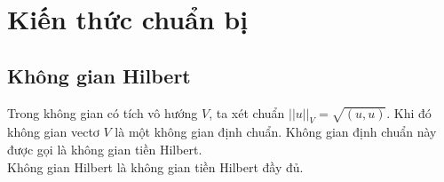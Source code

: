 \documentclass[
12pt, %
oneside, %
english, %
onehalfspacing, %
nolistspacing, %
headsepline, %
addchap,
]{MastersDoctoralThesis} %
\begin{document}
\mainmatter 

\pagestyle{thesis} 

%
\chapter{Kiến thức chuẩn bị}
\section{Không gian Hilbert}

\begin{defi}
Trong không gian có tích vô hướng $V$, ta xét chuẩn $||u||_V = \sqrt{(u,u)}$. Khi đó không gian vectơ $V$ là một không gian định chuẩn. Không gian định chuẩn này được gọi là không gian tiền Hilbert.\\
Không gian Hilbert là không gian tiền Hilbert đầy đủ.
\end{defi}
\end{document}
